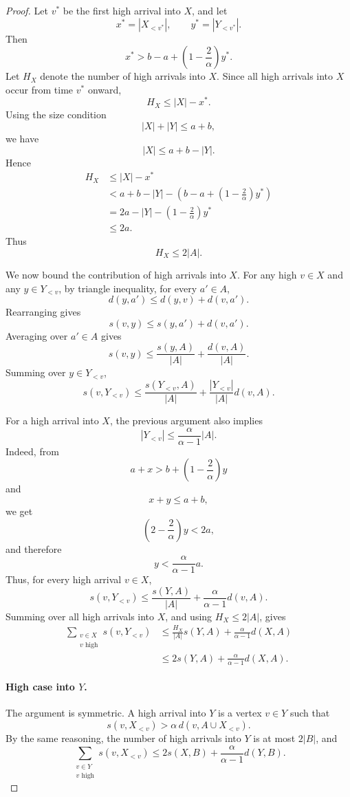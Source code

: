 \begin{proof}
Let $v^*$ be the first high arrival into $X$, and let
\[
    x^*=|X_{<v^*}|,
    \qquad
    y^*=|Y_{<v^*}|.
\]
Then
\[
    x^*
    >
    b-a+\left(1-\frac{2}{\alpha}\right)y^*.
\]
Let $H_X$ denote the number of high arrivals into $X$. Since all high arrivals
into $X$ occur from time $v^*$ onward,
\[
    H_X\le |X|-x^*.
\]
Using the size condition
\[
    |X|+|Y|\le a+b,
\]
we have
\[
    |X|\le a+b-|Y|.
\]
Hence
\[
\begin{aligned}
    H_X
    &\le |X|-x^*\\
    &<
    a+b-|Y|
    -
    \left(
        b-a+\left(1-\frac{2}{\alpha}\right)y^*
    \right)\\
    &=
    2a-|Y|-\left(1-\frac{2}{\alpha}\right)y^*\\
    &\le 2a.
\end{aligned}
\]
Thus
\[
    H_X\le 2|A|.
\]

We now bound the contribution of high arrivals into $X$. For any high
$v\in X$ and any $y\in Y_{<v}$, by triangle inequality, for every $a'\in A$,
\[
    d(y,a')\le d(y,v)+d(v,a').
\]
Rearranging gives
\[
    s(v,y)\le s(y,a')+d(v,a').
\]
Averaging over $a'\in A$ gives
\[
    s(v,y)
    \le
    \frac{s(y,A)}{|A|}
    +
    \frac{d(v,A)}{|A|}.
\]
Summing over $y\in Y_{<v}$,
\[
    s(v,Y_{<v})
    \le
    \frac{s(Y_{<v},A)}{|A|}
    +
    \frac{|Y_{<v}|}{|A|}d(v,A).
\]

For a high arrival into $X$, the previous argument also implies
\[
    |Y_{<v}|
    \le
    \frac{\alpha}{\alpha-1}|A|.
\]
Indeed, from
\[
    a+x
    >
    b+\left(1-\frac{2}{\alpha}\right)y
\]
and
\[
    x+y\le a+b,
\]
we get
\[
    \left(2-\frac{2}{\alpha}\right)y<2a,
\]
and therefore
\[
    y<\frac{\alpha}{\alpha-1}a.
\]
Thus, for every high arrival $v\in X$,
\[
    s(v,Y_{<v})
    \le
    \frac{s(Y,A)}{|A|}
    +
    \frac{\alpha}{\alpha-1}d(v,A).
\]
Summing over all high arrivals into $X$, and using $H_X\le 2|A|$, gives
\[
\begin{aligned}
    \sum_{\substack{v\in X\\ v\text{ high}}} s(v,Y_{<v})
    &\le
    \frac{H_X}{|A|}s(Y,A)
    +
    \frac{\alpha}{\alpha-1}d(X,A)\\
    &\le
    2s(Y,A)
    +
    \frac{\alpha}{\alpha-1}d(X,A).
\end{aligned}
\]

\paragraph{High case into $Y$.}
The argument is symmetric. A high arrival into $Y$ is a vertex $v\in Y$ such
that
\[
    s(v,X_{<v})
    >
    \alpha\,d(v,A\cup X_{<v}).
\]
By the same reasoning, the number of high arrivals into $Y$ is at most
$2|B|$, and
\[
    \sum_{\substack{v\in Y\\ v\text{ high}}} s(v,X_{<v})
    \le
    2s(X,B)
    +
    \frac{\alpha}{\alpha-1}d(Y,B).
\]


\end{proof}
